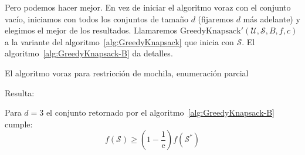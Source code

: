   Pero podemos hacer mejor.
  En vez de iniciar el algoritmo voraz con el conjunto vacío,
  iniciamos con todos los conjuntos de tamaño \(d\)
  (fijaremos \(d\) más adelante)
  y elegimos el mejor de los resultados.
  Llamaremos
    \(\mathrm{GreedyKnapsack}'(\mathscr{U}, \mathscr{S}, B, f, c)\)
  a la variante del algoritmo~\ref{alg:GreedyKnapsack}
  que inicia con \(\mathscr{S}\).
  El algoritmo~\ref{alg:GreedyKnapsack-B} da detalles.
  \begin{algorithm}[htbp]
    \DontPrintSemicolon\Indp

    \caption{El algoritmo voraz para restricción de mochila,
             enumeración parcial}
    \label{alg:GreedyKnapsack-B}
  \end{algorithm}
  Resulta:
  \begin{theorem}
    \label{theo:greedy-knapsack-B}
    Para \(d = 3\) el conjunto retornado
    por el algoritmo~\ref{alg:GreedyKnapsack-B} cumple:
    \begin{equation*}
      f(\mathscr{S})
        \ge \left(1 - \frac{1}{\mathrm{e}}\right) f(\mathscr{S}^*)
    \end{equation*}
  \end{theorem}
